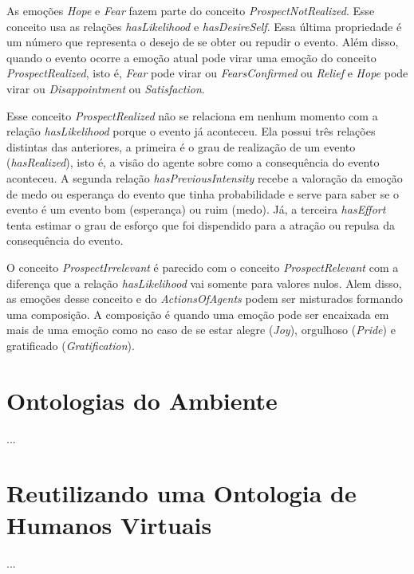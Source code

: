 As emoções \emph{Hope} e \emph{Fear} fazem parte do conceito
\emph{ProspectNotRealized}. Esse conceito usa as relações \emph{hasLikelihood}
e \emph{hasDesireSelf}. Essa última propriedade é um número que
representa o desejo de se obter ou repudir o evento. Além disso, quando o
evento ocorre a emoção atual pode virar uma emoção do conceito
\emph{ProspectRealized}, isto é, \emph{Fear} pode virar ou
\emph{FearsConfirmed} ou \emph{Relief} e \emph{Hope} pode virar ou
\emph{Disappointment} ou \emph{Satisfaction}.

Esse conceito \emph{ProspectRealized} não se relaciona em nenhum momento com a
relação \emph{hasLikelihood} porque o evento já aconteceu. Ela possui três
relações distintas das anteriores, a primeira é o grau de realização de um evento
(\emph{hasRealized}), isto é, a visão do agente sobre como a consequência do
evento aconteceu. A segunda relação \emph{hasPreviousIntensity} recebe a
valoração da emoção de medo ou esperança do evento que tinha probabilidade e
serve para saber se o evento é um evento bom (esperança) ou ruim (medo). Já, a
terceira \emph{hasEffort} tenta estimar o grau de esforço que foi dispendido
para a atração ou repulsa da consequência do evento.

O conceito \emph{ProspectIrrelevant} é parecido com o conceito
\emph{ProspectRelevant} com a diferença que a relação \emph{hasLikelihood} vai
somente para valores nulos. Alem disso, as emoções desse conceito e do
\emph{ActionsOfAgents} podem ser misturados formando uma composição. A
composição é quando uma emoção pode ser encaixada em mais de uma emoção como
no caso de se estar alegre (\emph{Joy}), orgulhoso (\emph{Pride}) e
gratificado (\emph{Gratification}).


\section{Ontologias do Ambiente} \label{cap:tp:oda}

...

\section{Reutilizando uma Ontologia de Humanos Virtuais} \label{cap:tp:ruodhv}

...

